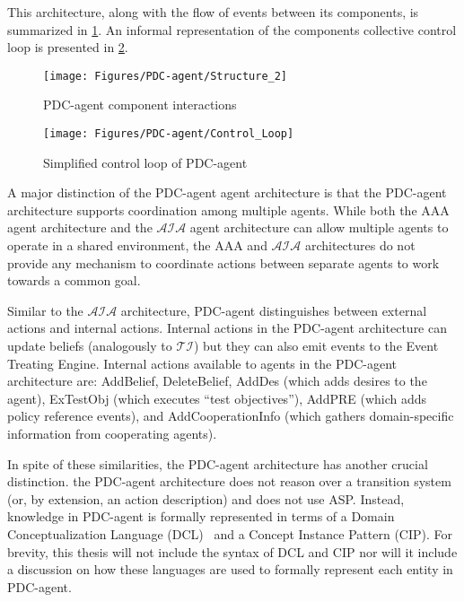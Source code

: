 This architecture, along with the flow of events between its components, is summarized in \cref{fig:pdc_agent_structure}.
An informal representation of the components collective control loop is presented in \cref{fig:pdc_agent_control_loop}\footnotemark.


\begin{figure}[p]
    \texttt{[image: Figures/PDC-agent/Structure\_2]}
    \centering
    \caption{PDC-agent component interactions}
    \label{fig:pdc_agent_structure}
\end{figure}

\begin{landscape}
    \begin{figure}[p]
        \texttt{[image: Figures/PDC-agent/Control\_Loop]}
        \centering
        \caption{Simplified control loop of PDC-agent}
        \label{fig:pdc_agent_control_loop}
    \end{figure}
\end{landscape}

A major distinction of the PDC-agent agent architecture is that the PDC-agent architecture supports coordination among multiple agents.
While both the AAA agent architecture and the $\mathcal{AIA}$ agent architecture can allow multiple agents to operate in a shared environment, the AAA and $\mathcal{AIA}$ architectures do not provide any mechanism to coordinate actions between separate agents to work towards a common goal.

Similar to the $\mathcal{AIA}$ architecture, PDC-agent distinguishes between external actions and internal actions.
Internal actions in the PDC-agent architecture can update beliefs (analogously to $\mathcal{TI}$) but they can also emit events to the Event Treating Engine.
Internal actions available to agents in the PDC-agent architecture are: AddBelief, DeleteBelief, AddDes (which adds desires to the agent), ExTestObj (which executes “test objectives”), AddPRE (which adds policy reference events), and AddCooperationInfo (which gathers domain-specific information from cooperating agents).

In spite of these similarities, the PDC-agent architecture has another crucial distinction.
the PDC-agent architecture does not reason over a transition system (or, by extension, an action description) and does not use ASP.
Instead, knowledge in PDC-agent is formally represented in terms of a Domain Conceptualization Language (DCL)~\citep{ji_gao_sasa5_2005} and a Concept Instance Pattern (CIP).
For brevity, this thesis will not include the syntax of DCL and CIP nor will it include a discussion on how these languages are used to formally represent each entity in PDC-agent.
